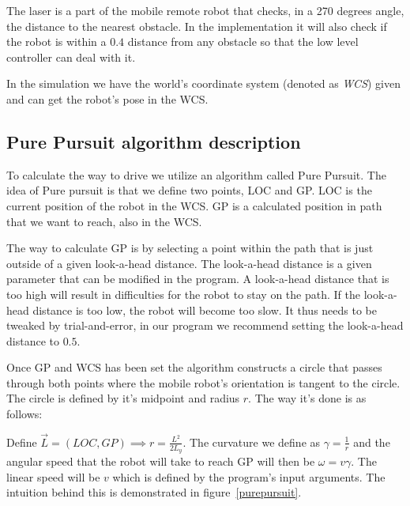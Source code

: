 \documentclass[12pt]{article}
\begin{document}
The laser is a part of the mobile remote robot that checks, in a 270 degrees angle,
the distance to the nearest obstacle. In the implementation it will also check
if the robot is within a $0.4$ distance from any obstacle so that the low level
controller can deal with it.

In the simulation we have the world's coordinate system (denoted as
\textit{WCS}) given and can get the robot's pose in the WCS. 

\subsection{Pure Pursuit algorithm description}

To calculate the way to drive we utilize an algorithm called Pure Pursuit. The
idea of Pure pursuit is that we define two points, LOC and GP. LOC is the
current position of the robot in the WCS. GP is a calculated position in path
that we want to reach, also in the WCS. 

The way to calculate GP is by selecting a point within the path that is
just outside of a given look-a-head distance. The look-a-head distance is a
given parameter that can be modified in the program. A look-a-head
distance that is too high will result in difficulties for the robot to stay on the path.
If the look-a-head distance is too low, the robot will become too slow. It thus needs
to be tweaked by trial-and-error, in our program we recommend setting the look-a-head
distance to $0.5$.

Once GP and WCS has been set the algorithm constructs a circle that passes
through both points where the mobile robot's orientation is tangent to the
circle. The circle is defined by it's midpoint and radius $r$. The way it's done is
as follows:

Define $\vec{L} = (LOC, GP) \implies r = \frac{L^2}{2L_{y}}$. The curvature we
define as $\gamma = \frac{1}{r}$ and the angular speed that the robot will
take to reach GP will then be $\omega = v\gamma$. The linear speed will 
be $v$ which is defined by the program's input arguments. The intuition behind
this is demonstrated in figure~\ref{purepursuit}.







\end{document}
